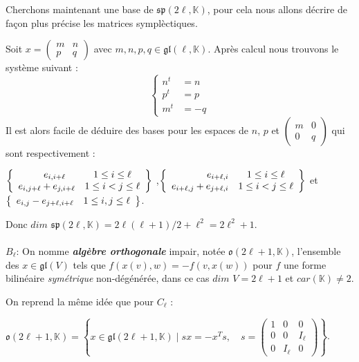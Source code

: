 \documentclass[a4paper,openany,12pt]{report}
\newcommand{\KK}{\mathbb{K}}
\newcommand{\gl}{\mathfrak{gl}}
\newcommand{\ssp}{\mathfrak{sp}}
\newcommand{\oo}{\mathfrak{o}}
\theoremstyle{break}
{\theorembodyfont{\upshape}
\newtheorem*{rmq}{Remarque :}
\newtheorem*{prv}{Preuve :}
\newtheorem*{ex}{Exemples :}
\newtheorem{exe}{Exemple : }
\newtheorem*{nota}{Notation :}}
\begin{document}
Cherchons maintenant une base de $\ssp(2 \ell,\KK)$, pour cela nous allons décrire de façon plus précise les matrices symplèctiques.

Soit $ x=\begin{pmatrix} m & n \\ p & q \end{pmatrix}$ avec $m,n,p,q \in \gl(\ell, \KK)$. Après calcul nous trouvons le système suivant : 
\[ \left\{
\begin{aligned}
n^t & = n \\
p^t & =p \\
 m^t & = -q
\end{aligned}
\right. \]
\quad Il est alors facile de déduire des bases pour les espaces de $n$, $p$ et $\begin{pmatrix}
m & 0 \\ 0 & q \end{pmatrix}$ qui sont respectivement :
\begin{center}
$\left \{
   \begin{array}{r c l}
e_{i,i+\ell}\quad & 1\leq i \leq \ell \\
e_{i,j+\ell}+e_{j,i+\ell} & 1\leq i < j \leq \ell
   \end{array}
   \right  \}$
,$\left \{
   \begin{array}{r c l}
e_{i+\ell,i} &1\leq i \leq \ell \\
e_{i+\ell,j}+e_{j+\ell,i} & 1\leq i < j \leq \ell
   \end{array}
  \right   \} $
et $\left \{
   \begin{array}{r c l}
e_{i,j}-e_{j+\ell,i+\ell} &1\leq i ,j \leq \ell
   \end{array}
\right   \}$.
\end{center}

Donc $dim$ $\ssp(2\ell,\KK) = 2\ell(\ell+1)/2+\ell^2 = 2\ell^2+1$.\\
\\
$ B_{\ell} $: On nomme \emph{\textbf{algèbre orthogonale}} impair, notée  $\oo(2\ell+1,\KK)$, l'ensemble des $x \in \gl(V)$ tels que $f(x(v),w)=-f(v,x(w))$ pour $f$ une forme bilinéaire \textit{symétrique} non-dégénérée, dans ce cas $dim$ $V=2\ell+1$ et $car(\KK) \ne 2$.

On reprend la même idée que pour $ C_{\ell} $ :
 
$\oo(2\ell+1,\KK)= \left \{ x \in \gl(2\ell+1, \KK) \mid sx= -x^Ts,\quad s = \begin{pmatrix} 1 & 0 & 0 \\ 0 & 0 & I_\ell \\ 0 & I_\ell & 0 \end{pmatrix} \right \}$.
\end{document}
